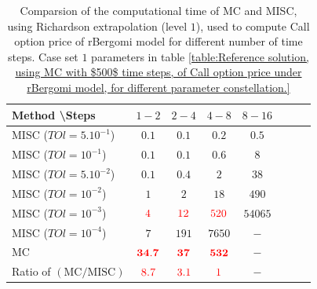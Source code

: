 \documentclass[11pt]{article}
\begin{document}
\begin{table}[!h]
	\centering
	\begin{tabular}{l*{6}{c}r}
		Method \textbackslash  Steps            & $1-2$ & $2-4$ & $4-8$ & $8-16$ &   \\
		\hline
		MISC ($TOl=5.10^{-1}$)  & $0.1$ & $0.1$ & $0.2$ & $0.5$  \\
		MISC ($TOl=10^{-1}$)  & $0.1$ & $0.1$ & $0.6$ & $8$  \\
		MISC ($TOl=5.10^{-2}$)  & $0.1$ & $0.4$ & $2$ & $38$  \\
		MISC ($TOl=10^{-2}$)  & $1$ & $2$ & $18$ & $490$  \\
		MISC ($TOl=10^{-3}$)  & ${\color{red}4}$ & ${\color{red}12}$ & ${\color{red}520}$ & $54065$  \\	
		MISC ($TOl=10^{-4}$)  & $7$ & $191$ & $7650$ & $-$  \\
		\hline
			MC   & $\mathbf{{\color{red} 34.7}}$  & $\mathbf{{\color{red}37}}$  & $\mathbf{ {\color{red}532}}$ &$\mathbf{-}$   \\
		\hline
			Ratio of $\left(\text{MC}/ \text{MISC} \right)$  &${\color{red}8.7}$ & ${\color{red}   3.1
		}$  & ${\color{red}1}$ &  $-$ \\
		\hline
	\end{tabular}
	\caption{Comparsion of the computational time of  MC and MISC, using Richardson extrapolation (level $1$), used to compute Call option price of rBergomi model for different number of time steps. Case set $1$ parameters in table \ref{table:Reference solution, using MC with $500$ time steps, of Call option price under rBergomi model, for different parameter constellation.}}
	\label{Comparsion of the computational time of  MC and MISC, using Richardson extrapolation (level $1$), used to compute Call option price of rBergomi model for different number of time steps. Case set $1$ parameters}
\end{table}
\end{document}
